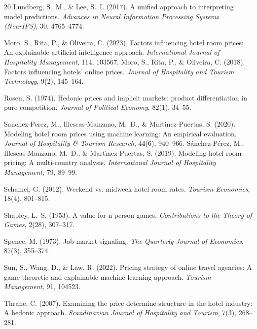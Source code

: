 \documentclass[11pt,a4paper]{article}
\begin{document}
\begin{thebibliography}{20}
Lundberg, S.~M., \& Lee, S.~I. (2017). A unified approach to interpreting model predictions. \textit{Advances in Neural Information Processing Systems (NeurIPS)}, 30, 4765--4774.

Moro, S., Rita, P., \& Oliveira, C. (2023). Factors influencing hotel room prices: An explainable artificial intelligence approach. \textit{International Journal of Hospitality Management}, 114, 103567.
Moro, S., Rita, P., \& Oliveira, C. (2018). Factors influencing hotels' online prices. \textit{Journal of Hospitality and Tourism Technology}, 9(2), 145--164.

Rosen, S. (1974). Hedonic prices and implicit markets: product differentiation in pure competition. \textit{Journal of Political Economy}, 82(1), 34--55.

Sanchez-Perez, M., Illescas-Manzano, M.~D., \& Martinez-Puertas, S. (2020). Modeling hotel room prices using machine learning: An empirical evaluation. \textit{Journal of Hospitality \& Tourism Research}, 44(6), 940--966.
S{\'a}nchez-P{\'e}rez, M., Illescas-Manzano, M.~D., \& Mart{\'\i}nez-Puertas, S. (2019). Modeling hotel room pricing: A multi-country analysis. \textit{International Journal of Hospitality Management}, 79, 89--99.

Schamel, G. (2012). Weekend vs. midweek hotel room rates. \textit{Tourism Economics}, 18(4), 801--815.

Shapley, L.~S. (1953). A value for n-person games. \textit{Contributions to the Theory of Games}, 2(28), 307--317.

Spence, M. (1973). Job market signaling. \textit{The Quarterly Journal of Economics}, 87(3), 355--374.

Sun, S., Wang, D., \& Law, R. (2022). Pricing strategy of online travel agencies: A game-theoretic and explainable machine learning approach. \textit{Tourism Management}, 91, 104523.

Thrane, C. (2007). Examining the price determine structure in the hotel industry: A hedonic approach. \textit{Scandinavian Journal of Hospitality and Tourism}, 7(3), 268--281.


\end{thebibliography}
\end{document}
